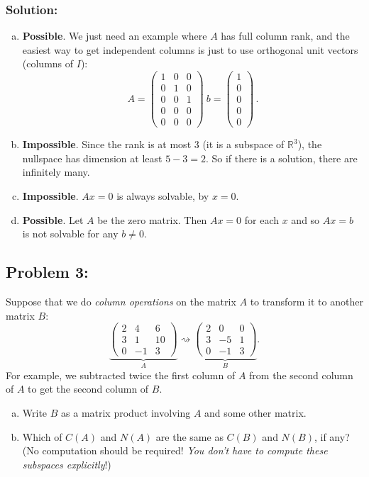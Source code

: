 \documentclass{article}
\begin{document}
\subsubsection*{Solution:}
\begin{enumerate}[(a)]
    \item \textbf{Possible}. We just need an example where $A$ has full column rank, and the easiest way to get independent columns is just to use orthogonal unit vectors (columns of $I$):
    \[A=\begin{pmatrix} 1 & 0 & 0\\ 0&1&0\\ 0&0&1\\ 0&0&0 \\ 0&0&0\end{pmatrix}\ b=\begin{pmatrix} 1\\0\\0\\0\\0\end{pmatrix}\,.\]
    \item \textbf{Impossible}. Since the rank is at most 3 (it is a subspace of $\mathbb{R}^3$), the nullspace has dimension at least $5-3=2$. So if there is a solution, there are infinitely many.
    \item \textbf{Impossible}. $Ax=0$ is always solvable, by $x=0$.
    \item \textbf{Possible}. Let $A$ be the zero matrix. Then $Ax=0$ for each $x$ and so $Ax=b$ is not solvable for any $b\neq0$.
\end{enumerate}

\subsection*{Problem 3:}

Suppose that we do \emph{column operations} on the matrix $A$ to
transform it to another matrix $B$:
\[
\underbrace{\left(\begin{array}{ccc}
2 & 4 & 6\\
3 & 1 & 10\\
0 & -1 & 3
\end{array}\right)}_{A}\rightsquigarrow\underbrace{\left(\begin{array}{ccc}
2 & 0 & 0\\
3 & -5 & 1\\
0 & -1 & 3
\end{array}\right)}_{B}.
\]
For example, we subtracted twice the first column of $A$ from the
second column of $A$ to get the second column of $B$.
\begin{enumerate}[(a)]
\item Write $B$ as a matrix product involving $A$ and some other matrix.
\item Which of $C(A)$ and $N(A)$ are the same as $C(B)$ and $N(B)$,
if any? (No computation should be required! \emph{You don't have to
compute these subspaces explicitly}!)
\end{enumerate}
\end{document}
